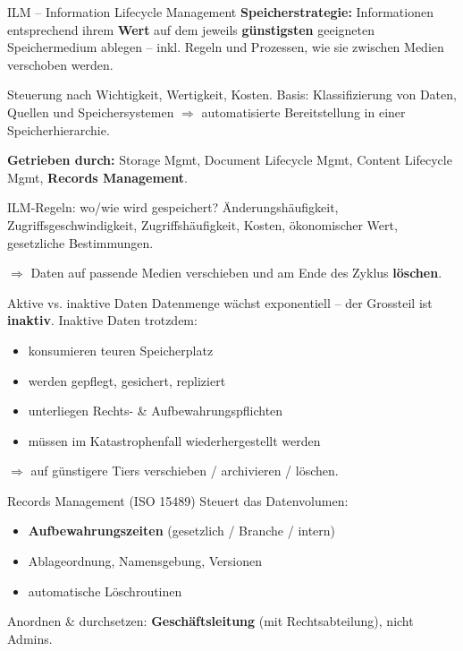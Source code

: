 \documentclass[a4paper, fontsize=7pt]{scrartcl}
\begin{document}
\begin{mainbox}{ILM -- Information Lifecycle Management}
\textbf{Speicherstrategie:} Informationen entsprechend ihrem \textbf{Wert} auf
dem jeweils \textbf{günstigsten} geeigneten Speichermedium ablegen -- inkl.
Regeln und Prozessen, wie sie zwischen Medien verschoben werden.

Steuerung nach Wichtigkeit, Wertigkeit, Kosten. Basis: Klassifizierung von
Daten, Quellen und Speichersystemen $\Rightarrow$ automatisierte Bereitstellung
in einer Speicherhierarchie.

\textbf{Getrieben durch:} Storage Mgmt, Document Lifecycle Mgmt, Content
Lifecycle Mgmt, \textbf{Records Management}.
\end{mainbox}

\begin{mainbox}{ILM-Regeln: wo/wie wird gespeichert?}
Änderungshäufigkeit, Zugriffsgeschwindigkeit, Zugriffshäufigkeit, Kosten,
ökonomischer Wert, gesetzliche Bestimmungen.

$\Rightarrow$ Daten auf passende Medien verschieben und am Ende des Zyklus
\textbf{löschen}.
\end{mainbox}

\begin{subbox}{Aktive vs. inaktive Daten}
Datenmenge wächst exponentiell -- der Grossteil ist \textbf{inaktiv}.
Inaktive Daten trotzdem:
\begin{itemize}
    \item konsumieren teuren Speicherplatz
    \item werden gepflegt, gesichert, repliziert
    \item unterliegen Rechts- \& Aufbewahrungspflichten
    \item müssen im Katastrophenfall wiederhergestellt werden
\end{itemize}
$\Rightarrow$ auf günstigere Tiers verschieben / archivieren / löschen.
\end{subbox}

\begin{mainbox}{Records Management (ISO 15489)}
Steuert das Datenvolumen:
\begin{itemize}
    \item \textbf{Aufbewahrungszeiten} (gesetzlich / Branche / intern)
    \item Ablageordnung, Namensgebung, Versionen
    \item automatische Löschroutinen
\end{itemize}
Anordnen \& durchsetzen: \textbf{Geschäftsleitung} (mit Rechtsabteilung),
nicht Admins.
\end{mainbox}
\end{document}

